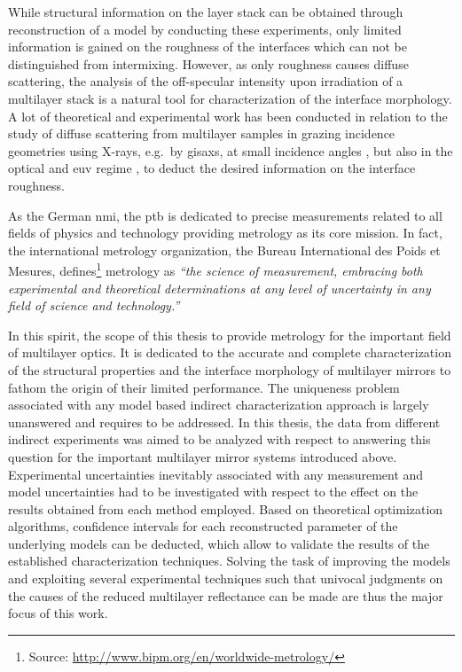 While structural information on the layer stack can be obtained through reconstruction of a model by conducting these experiments, only limited information is gained on the roughness of the interfaces which can not be distinguished from intermixing. However, as only roughness causes diffuse scattering, the analysis of the off-specular intensity upon irradiation of a multilayer stack is a natural tool for characterization of the interface morphology. A lot of theoretical and experimental work has been conducted in relation to the study of diffuse scattering from multilayer samples in grazing incidence geometries using X-rays, e.g.~by \gls{gisaxs}, at small incidence angles \cite{mikulik_x-ray_1997, sinha_x-ray_1994, de_boer_x-ray_1995, de_boer_x-ray_1996, salditt_kinetic_1994, levine_grazing-incidence_1989,siffalovic_characterization_2009}, but also in the optical and \gls{euv} regime \cite{amra_light_1993, amra_light_1994, elson_light_1980, elson_relationship_1983, schroder_angle-resolved_2011, schroder_spectral_2014}, to deduct the desired information on the interface roughness.

As the German \gls{nmi}, the \gls{ptb} is dedicated to precise measurements related to all fields of physics and technology providing metrology as its core mission. In fact, the international metrology organization, the Bureau International des Poids et Mesures, defines\footnote{Source: \url{http://www.bipm.org/en/worldwide-metrology/}} metrology as \emph{``the science of measurement, embracing both experimental and theoretical determinations at any level of uncertainty in any field of science and technology.''}

In this spirit, the scope of this thesis to provide metrology for the important field of multilayer optics. It is dedicated to the accurate and complete characterization of the structural properties and the interface morphology of multilayer mirrors to fathom the origin of their limited performance. The uniqueness problem associated with any model based indirect characterization approach is largely unanswered and requires to be addressed. In this thesis, the data from different indirect experiments was aimed to be analyzed with respect to answering this question for the important multilayer mirror systems introduced above. Experimental uncertainties inevitably associated with any measurement and model uncertainties had to be investigated with respect to the effect on the results obtained from each method employed. Based on theoretical optimization algorithms, confidence intervals for each reconstructed parameter of the underlying models can be deducted, which allow to validate the results of the established characterization techniques. Solving the task of improving the models and exploiting several experimental techniques such that univocal judgments on the causes of the reduced multilayer reflectance can be made are thus the major focus of this work.

